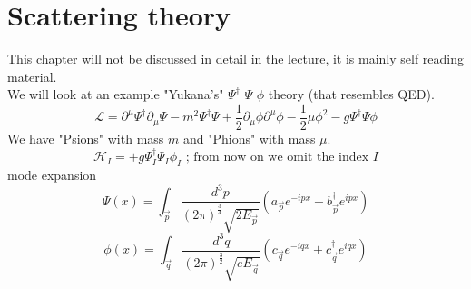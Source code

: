 \documentclass{report}
\begin{document}
\chapter{Scattering theory}
This chapter will not be discussed in detail in the lecture, it is mainly self reading material.\\
We will look at an example "Yukana's" $\Psi^\dagger$ $\Psi$ $\phi$ theory (that resembles QED). \[
  \mathcal{L} = \partial^\mu \Psi^\dagger \partial_\mu \Psi - m^2 \Psi^\dagger \Psi + \frac{1}{2} \partial_\mu \phi \partial^\mu \phi - \frac{1}{2} \mu \phi^2 - g \Psi^\dagger \Psi \phi
\] We have "Psions" with mass $m$ and "Phions" with mass $\mu$.
\[
  \mathcal{H}_I = +g \Psi_I^\dagger \Psi_I \phi_I \text{ ; from now on we omit the index } I
\] mode expansion \[
\Psi(x) = \int_{\vec{p}} \frac{d^3p}{(2 \pi)^{\frac{3}{4}} \sqrt{2E_{\vec{p}}} } \left( a_{\vec{p}} e^{-ipx} + b_{\vec{p}}^\dagger e^{ipx} \right) 
\] \[
\phi(x) = \int_{\vec{q}} \frac{d^3q}{(2\pi)^{\frac{3}{2}} \sqrt{e E_{\vec{q}}} } \left( c_{\vec{q}} e^{-iqx} + c_{\vec{q}}^\dagger e^{iqx} \right) 
\] 
\end{document}
